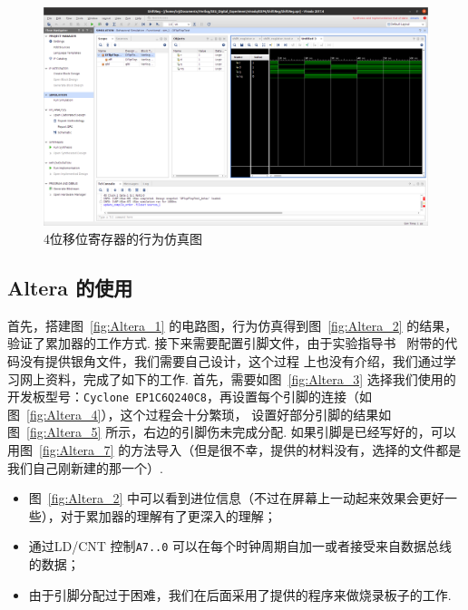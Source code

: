 \documentclass[11pt]{SEU-Digital-Report}
\begin{document}
      \clearpage
      \begin{figure}[htbp]
        \centering
        \includegraphics[width=\linewidth]{fig/Reg_simu.png}
        \caption{4位移位寄存器的行为仿真图}
        \label{fig:Reg_simu}
      \end{figure}

    \subsection{Altera 的使用}

      首先，搭建图~\ref{fig:Altera_1} 的电路图，行为仿真得到图~\ref{fig:Altera_2} 的结果，验证了累加器的工作方式.
      接下来需要配置引脚文件，由于实验指导书~\cite{guide} 附带的代码没有提供银角文件，我们需要自己设计，这个过程 \cite{guide} 上也没有介绍，我们通过学习网上资料，完成了如下的工作.
      首先，需要如图~\ref{fig:Altera_3} 选择我们使用的开发板型号：\texttt{Cyclone EP1C6Q240C8}，再设置每个引脚的连接（如图~\ref{fig:Altera_4}），这个过程会十分繁琐，
      设置好部分引脚的结果如图~\ref{fig:Altera_5} 所示，右边的引脚伤未完成分配.
      如果引脚是已经写好的，可以用图~\ref{fig:Altera_7} 的方法导入（但是很不幸，提供的材料没有，选择的文件都是我们自己刚新建的那一个）.


      \begin{analyze}{}{}
        \begin{itemize}
          \item 图~\ref{fig:Altera_2} 中可以看到进位信息（不过在屏幕上一动起来效果会更好一些），对于累加器的理解有了更深入的理解；
          \item 通过LD/CNT 控制\texttt{A7..0}
          可以在每个时钟周期自加一或者接受来自数据总线的数据；
          \item 由于引脚分配过于困难，我们在后面采用了提供的程序来做烧录板子的工作.
        \end{itemize}
      \end{analyze}
\end{document}
